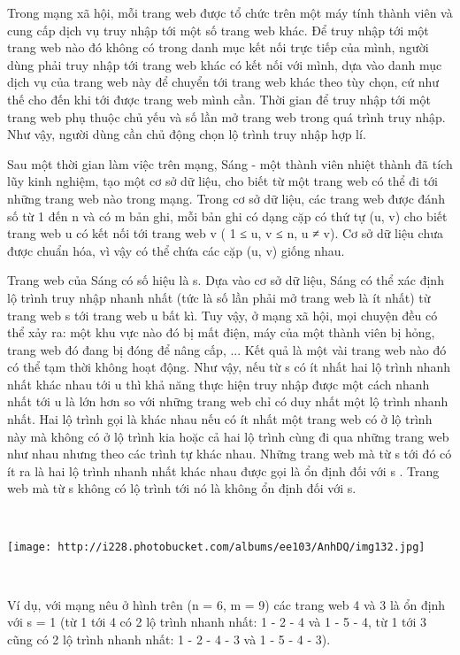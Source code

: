 

Trong mạng xã hội, mỗi trang web được tổ chức trên một máy tính thành viên và cung cấp dịch vụ truy nhập tới một số trang web khác. Để truy nhập tới một trang web nào đó không có trong danh mục kết nối trực tiếp của mình, người dùng phải truy nhập tới trang web khác có kết nối với mình, dựa vào danh mục dịch vụ của trang web này để chuyển tới trang web khác theo tùy chọn, cứ như thế cho đến khi tới được trang web mình cần. Thời gian để truy nhập tới một trang web phụ thuộc chủ yếu và số lần mở trang web trong quá trình truy nhập. Như vậy, người dùng cần chủ động chọn lộ trình truy nhập hợp lí.

Sau một thời gian làm việc trên mạng, Sáng - một thành viên nhiệt thành đã tích lũy kinh nghiệm, tạo một cơ sở dữ liệu, cho biết từ một trang web có thể đi tới những trang web nào trong mạng. Trong cơ sở dữ liệu, các trang web được đánh số từ 1 đến n và có m bản ghi, mỗi bản ghi có dạng cặp có thứ tự (u, v) cho biết trang web u có kết nối tới trang web v ( 1 ≤ u, v ≤ n, u ≠ v). Cơ sở dữ liệu chưa được chuẩn hóa, vì vậy có thể chứa các cặp (u, v) giống nhau.

Trang web của Sáng có số hiệu là s. Dựa vào cơ sở dữ liệu, Sáng có thể xác định lộ trình truy nhập nhanh nhất (tức là số lần phải mở trang web là ít nhất) từ trang web s tới trang web u bất kì. Tuy vậy, ở mạng xã hội, mọi chuyện đều có thể xảy ra: một khu vực nào đó bị mất điện, máy của một thành viên bị hỏng, trang web đó đang bị đóng để nâng cấp, ... Kết quả là một vài trang web nào đó có thể tạm thời không hoạt động. Như vậy, nếu từ s có ít nhất hai lộ trình nhanh nhất khác nhau tới u thì khả năng thực hiện truy nhập được một cách nhanh nhất tới u là lớn hơn so với những trang web chỉ có duy nhất một lộ trình nhanh nhất. Hai lộ trình gọi là khác nhau nếu có ít nhất một trang web có ở lộ trình này mà không có ở lộ trình kia hoặc cả hai lộ trình cùng đi qua những trang web như nhau nhưng theo các trình tự khác nhau. Những trang web mà từ s tới đó có ít ra là hai lộ trình nhanh nhất khác nhau được gọi là ổn định đối với s . Trang web mà từ s không có lộ trình tới nó là không ổn định đối với s.

 


\texttt{[image: http://i228.photobucket.com/albums/ee103/AnhDQ/img132.jpg]}

 

Ví dụ, với mạng nêu ở hình trên (n = 6, m = 9) các trang web 4 và 3 là ổn định với s = 1 (từ 1 tới 4 có 2 lộ trình nhanh nhất: 1 - 2 - 4 và 1 - 5 - 4, từ 1 tới 3 cũng có 2 lộ trình nhanh nhất: 1 - 2 - 4 - 3 và 1 - 5 - 4 - 3).

